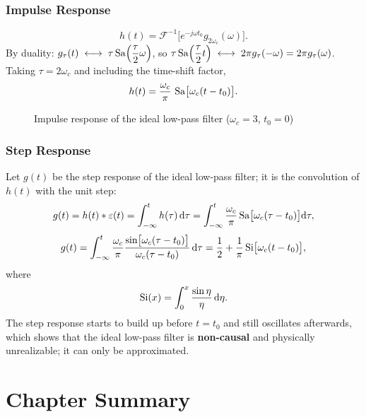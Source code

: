 \subsubsection{Impulse Response}

\[
    h(t)=\mathcal{F}^{-1}\bigl[e^{-j\omega t_0}g_{2\omega_c}(\omega)\bigr].
\]
By duality: $g_\tau(t)\;\longleftrightarrow\;\tau\operatorname{Sa}\!\left(\dfrac{\tau}{2}\omega\right)$, so
$\tau\operatorname{Sa}\!\left(\dfrac{\tau}{2}t\right)\;\longleftrightarrow\; 2\pi g_\tau(-\omega)=2\pi g_\tau(\omega)$.
Taking $\tau=2\omega_c$ and including the time-shift factor,
\[
    h(t)=\frac{\omega_c}{\pi}\,\operatorname{Sa}\bigl[\omega_c(t-t_0)\bigr].
\]

\begin{figure}[htbp]
\centering
{}
\caption{Impulse response of the ideal low-pass filter
($\omega_c=3$, $t_0=0$)}
\end{figure}

\subsubsection{Step Response}

Let $g(t)$ be the step response of the ideal low-pass filter; it is the
convolution of $h(t)$ with the unit step:
\[
    g(t)=h(t)*\varepsilon(t)=\int_{-\infty}^{t}h(\tau)\,\mathrm{d}\tau
    =\int_{-\infty}^{t}\frac{\omega_c}{\pi}\operatorname{Sa}\bigl[\omega_c(\tau-t_0)\bigr]\mathrm{d}\tau,
\]
\[
    g(t)=\int_{-\infty}^{t}\frac{\omega_c}{\pi}
    \frac{\sin\bigl[\omega_c(\tau-t_0)\bigr]}{\omega_c(\tau-t_0)}\,\mathrm{d}\tau
    =\frac{1}{2}+\frac{1}{\pi}\operatorname{Si}\bigl[\omega_c(t-t_0)\bigr],
\]
where
\[
    \operatorname{Si}(x)=\int_0^{x}\frac{\sin\eta}{\eta}\,\mathrm{d}\eta .
\]
The step response starts to build up before $t=t_0$ and still oscillates
afterwards, which shows that the ideal low-pass filter is \textbf{non-causal}
and physically unrealizable; it can only be approximated.

\section{Chapter Summary}

